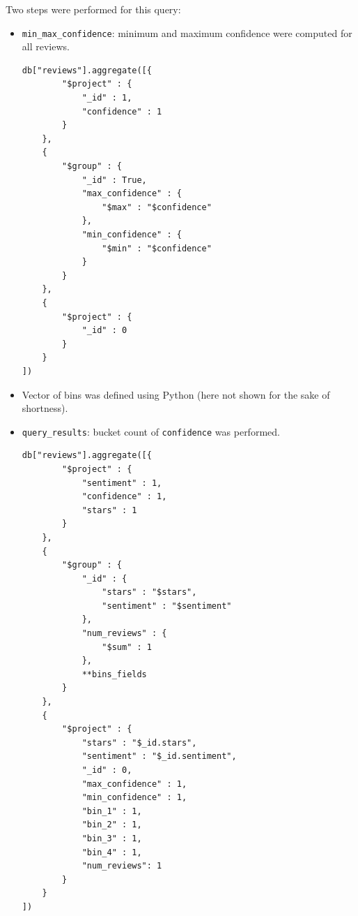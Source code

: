 \documentclass{Configuration_Files/PoliMi3i_thesis}
\begin{document}
Two steps were performed for this query:
\begin{itemize}
\item \texttt{min\_max\_confidence}: minimum and maximum confidence were computed for all reviews. 

\bigskip

\begin{lstlisting}[style = mongodb]
    db["reviews"].aggregate([{
        "$project" : {
            "_id" : 1,
            "confidence" : 1
        }
    },
    {
        "$group" : {
            "_id" : True,
            "max_confidence" : {
                "$max" : "$confidence"
            },
            "min_confidence" : {
                "$min" : "$confidence"
            }
        }
    },
    {
        "$project" : {
            "_id" : 0
        }
    }
])
\end{lstlisting}

\bigskip

\item Vector of bins was defined using Python (here not shown for the sake of shortness).

\item \texttt{query\_results}: bucket count of \texttt{confidence} was performed.

\bigskip

\begin{lstlisting}[style = mongodb]
db["reviews"].aggregate([{
        "$project" : {
            "sentiment" : 1,
            "confidence" : 1,
            "stars" : 1
        }
    },
    {
        "$group" : {
            "_id" : {
                "stars" : "$stars",
                "sentiment" : "$sentiment"
            },
            "num_reviews" : {
                "$sum" : 1
            },
            **bins_fields
        }
    },
    {
        "$project" : {
            "stars" : "$_id.stars",
            "sentiment" : "$_id.sentiment",
            "_id" : 0,
            "max_confidence" : 1,
            "min_confidence" : 1,
            "bin_1" : 1,
            "bin_2" : 1, 
            "bin_3" : 1,
            "bin_4" : 1,
            "num_reviews": 1
        }
    }
])
\end{lstlisting}

\bigskip

\end{itemize}

\end{document}
